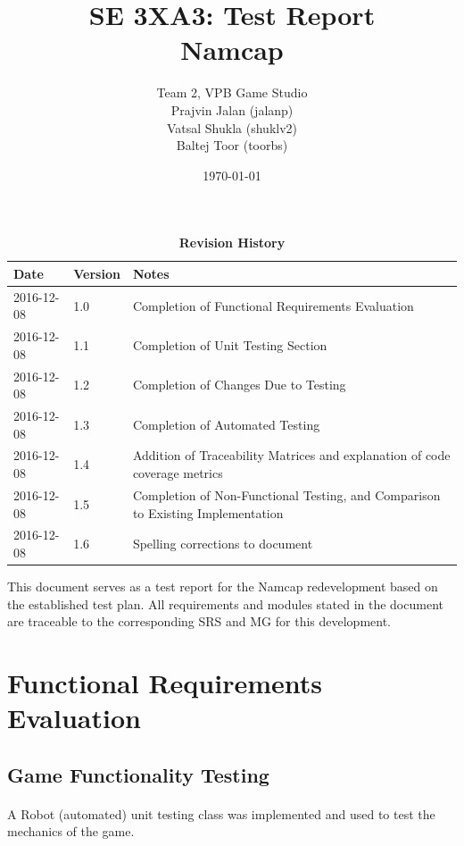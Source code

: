 \documentclass[12pt, titlepage]{article}
\title{SE 3XA3: Test Report\\Namcap}
\author{Team 2, VPB Game Studio
		\\ Prajvin Jalan (jalanp)
		\\ Vatsal Shukla (shuklv2)
		\\ Baltej Toor (toorbs)
}
\date{\today}
\begin{document}
\maketitle

\tableofcontents
\listoftables
\listoffigures

\begin{table}[h]
\caption{\bf Revision History}
\begin{tabularx}{\textwidth}{p{3cm}p{2cm}X}
\toprule {\bf Date} & {\bf Version} & {\bf Notes}\\
\midrule
2016-12-08 & 1.0 & Completion of Functional Requirements Evaluation\\
2016-12-08 & 1.1 & Completion of Unit Testing Section\\
2016-12-08 & 1.2 & Completion of Changes Due to Testing\\
2016-12-08 & 1.3 & Completion of Automated Testing\\
2016-12-08 & 1.4 & Addition of Traceability Matrices and explanation of code coverage metrics\\
2016-12-08 & 1.5 & Completion of Non-Functional Testing, and Comparison to Existing Implementation\\
2016-12-08 & 1.6 & Spelling corrections to document\\
\bottomrule
\end{tabularx}
\end{table}

\newpage


This document serves as a test report for the Namcap redevelopment based on the established test plan. All requirements and modules stated in the document are traceable to the corresponding SRS and MG for this development.

\section{Functional Requirements Evaluation}

\subsection{Game Functionality Testing}

\paragraph{}
A Robot (automated) unit testing class was implemented and used to test the mechanics of the game.
\end{document}
